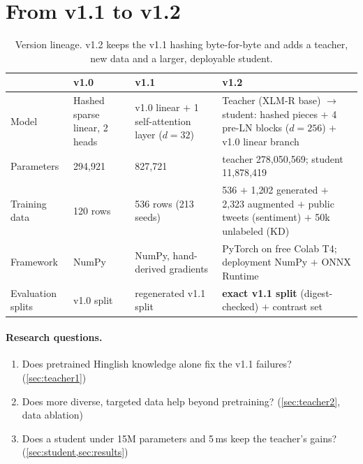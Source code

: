 \documentclass[11pt,a4paper]{article}
\theoremstyle{remark}
\begin{document}
\section{From v1.1 to v1.2}
\label{sec:overview}

\begin{table}[h]
\centering\small
\caption{Version lineage. v1.2 keeps the v1.1 hashing byte-for-byte and adds a teacher, new data and a larger, deployable student.}
\label{tab:lineage}
\begin{tabularx}{\linewidth}{@{}l X X X@{}}
\toprule
& v1.0 & v1.1 & v1.2 \\
\midrule
Model & Hashed sparse linear, 2 heads & v1.0 linear $+$ 1 self-attention layer ($d{=}32$) & Teacher (XLM-R base) $\to$ student: hashed pieces $+$ 4 pre-LN blocks ($d{=}256$) $+$ v1.0 linear branch \\
Parameters & 294{,}921 & 827{,}721 & teacher 278{,}050{,}569; student 11{,}878{,}419 \\
Training data & 120 rows & 536 rows (213 seeds) & 536 $+$ 1{,}202 generated $+$ 2{,}323 augmented $+$ public tweets (sentiment) $+$ 50k unlabeled (KD) \\
Framework & NumPy & NumPy, hand-derived gradients & PyTorch on free Colab T4; deployment NumPy $+$ ONNX Runtime \\
Evaluation splits & v1.0 split & regenerated v1.1 split & \textbf{exact v1.1 split} (digest-checked) $+$ contrast set \\
\bottomrule
\end{tabularx}
\end{table}

\paragraph{Research questions.}
\begin{enumerate}
  \item[\textbf{Q1}] Does pretrained Hinglish knowledge alone fix the v1.1 failures? (\cref{sec:teacher1})
  \item[\textbf{Q2}] Does more diverse, targeted data help beyond pretraining? (\cref{sec:teacher2}, data ablation)
  \item[\textbf{Q3}] Does a student under 15M parameters and 5\,ms keep the teacher's gains? (\cref{sec:student,sec:results})
\end{enumerate}
\end{document}
